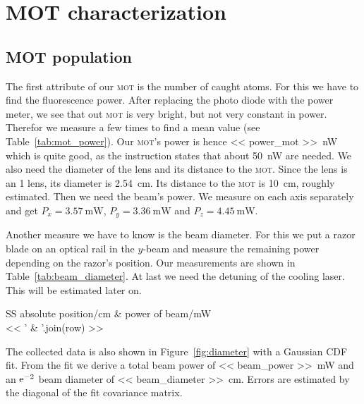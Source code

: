 \documentclass[11pt, english, fleqn, DIV=15, headinclude, BCOR=2cm]{scrreprt}
\newcommand\mot{\textsc{mot}}
\begin{document}
\section{MOT characterization}

\subsection{MOT population}

The first attribute of our \mot{} is the number of caught atoms. For this we
have to find the fluorescence power. After replacing the photo diode with the
power meter, we see that out \mot{} is very bright, but not very constant in
power.  Therefor we measure a few times to find a mean value (see
Table~\ref{tab:mot_power}). Our \mot's power is hence \SI{<< power_mot
>>}{\nano\watt} which is quite good, as the instruction states that about
\SI{50}{\nano\watt} are needed. We also need the diameter of the lens and its
distance to the \mot. Since the lens is an \SI{1}{\inch} lens, its diameter is
\SI{2.54}{\centi\meter}. Its distance to the \mot{} is \SI{10}{\centi\meter},
roughly estimated. Then we need the beam's power. We measure on each axis
separately and get $P_x = \SI{3.57}{\milli\watt}$, $P_y =
\SI{3.36}{\milli\watt}$ and $P_z = \SI{4.45}{\milli\watt}$.

Another measure we have to know is the beam diameter. For this we put a razor
blade on an optical rail in the $y$-beam and measure the remaining power
depending on the razor's position. Our measurements are shown in
Table~\ref{tab:beam_diameter}. At last we need the detuning of the cooling
laser. This will be estimated later on.

\begin{table}
    \centering
    \begin{tabular}{SS}
        \toprule
        {absolute position/\si{\centi\meter}}
        & {power of beam/\si{\milli\watt}} \\
        \midrule
        << ' & '.join(row) >> \\
        \bottomrule
    \end{tabular}
    \caption{%
        Measurement to estimate the beam diameter.
    }
    \label{tab:beam_diameter}
\end{table}

The collected data is also shown in Figure~\ref{fig:diameter} with a Gaussian
CDF fit. From the fit we derive a total beam power of \SI{<< beam_power
>>}{\milli\watt} and an $\mathrm e^{-2}$ beam diameter of \SI{<< beam_diameter
>>}{\centi\meter}. Errors are estimated by the diagonal of the fit covariance
matrix.
\end{document}
